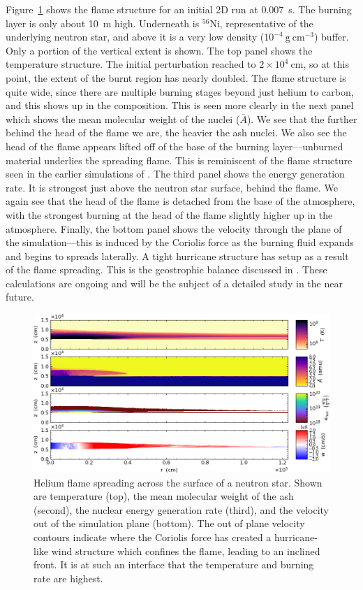 \documentclass[a4paper]{jpconf}
\newcommand{\isot}[2]{$^{#2}\mathrm{#1}$}
\newcommand{\gcc}{\mathrm{g~cm^{-3} }}
\begin{document}
Figure~\ref{fig:xrb} shows the flame structure for an initial 2D run
at 0.007~s.  The burning layer is only about 10~m high.  Underneath is
\isot{Ni}{56}, representative of the underlying neutron star, and
above it is a very low density ($10^{-4}~\gcc$) buffer.  Only a
portion of the vertical extent is shown.  The top panel shows the
temperature structure.  The initial perturbation reached to $2\times
10^4~\mathrm{cm}$, so at this point, the extent of the burnt region
has nearly doubled.  The flame structure is quite wide, since there
are multiple burning stages beyond just helium to carbon, and this
shows up in the composition.  This is seen more clearly in the next
panel which shows the mean molecular weight of the nuclei ($\bar{A}$).
We see that the further behind the head of the flame we are, the heavier
the ash nuclei.  We also see the head of the flame
appears lifted off of the base of the burning layer---unburned
material underlies the spreading flame.  This is
reminiscent of the flame structure seen in the earlier simulations of
\cite{cavecchi:2012}.  The third panel shows the energy generation rate.
It is strongest just above the neutron star surface, behind the flame.
We again see that the head of the flame is detached from the base
of the atmosphere, with the strongest burning at the head of the flame
slightly higher up in the atmosphere.   Finally, the bottom
panel shows the velocity through the plane of the simulation---this is
induced by the Coriolis force as the burning fluid expands and begins to spreads laterally.
A tight hurricane structure has setup as a result of the flame
spreading.  This is the geostrophic balance discussed in
\cite{SPIT_ETAL02}.    These calculations are ongoing and will be
the subject of a detailed study in the near future.

\begin{figure}
\centering
\includegraphics[width=0.95\linewidth]{xrb}
\caption{\label{fig:xrb} Helium flame spreading across the surface of
  a neutron star.  Shown are temperature (top), the mean molecular
  weight of the ash (second), the nuclear energy generation rate
  (third), and the velocity out of the simulation plane (bottom).  The
  out of plane velocity contours indicate where the Coriolis force has
  created a hurricane-like wind structure which confines the flame,
  leading to an inclined front. It is at such an interface that the
  temperature and burning rate are highest.  }
\end{figure}
\end{document}
